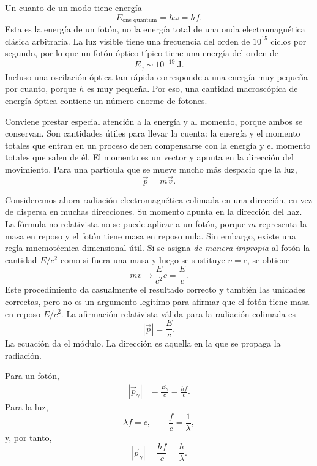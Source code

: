 Un cuanto de un modo tiene energía
\begin{equation}
E_{\text{one quantum}}=\hbar\omega=hf.
\end{equation}
Esta es la energía de un fotón, no la energía total de una onda electromagnética clásica arbitraria. La luz visible tiene una frecuencia del orden de \(10^{15}\) ciclos por segundo, por lo que un fotón óptico típico tiene una energía del orden de
\begin{equation}
E_\gamma\sim 10^{-19}\ \mathrm{J}.
\end{equation}
Incluso una oscilación óptica tan rápida corresponde a una energía muy pequeña por cuanto, porque \(h\) es muy pequeña. Por eso, una cantidad macroscópica de energía óptica contiene un número enorme de fotones.

Conviene prestar especial atención a la energía y al momento, porque ambos se conservan. Son cantidades útiles para llevar la cuenta: la energía y el momento totales que entran en un proceso deben compensarse con la energía y el momento totales que salen de él. El momento es un vector y apunta en la dirección del movimiento. Para una partícula que se mueve mucho más despacio que la luz,
\begin{equation}
\vec p=m\vec v.
\end{equation}

Consideremos ahora radiación electromagnética colimada en una dirección, en vez de dispersa en muchas direcciones. Su momento apunta en la dirección del haz. La fórmula no relativista no se puede aplicar a un fotón, porque \(m\) representa la masa en reposo y el fotón tiene masa en reposo nula. Sin embargo, existe una regla mnemotécnica dimensional útil. Si se asigna \emph{de manera impropia} al fotón la cantidad \(E/c^2\) como si fuera una masa y luego se sustituye \(v=c\), se obtiene
\begin{equation}
mv\longrightarrow \frac{E}{c^2}c=\frac{E}{c}.
\end{equation}
Este procedimiento da casualmente el resultado correcto y también las unidades correctas, pero no es un argumento legítimo para afirmar que el fotón tiene masa en reposo \(E/c^2\). La afirmación relativista válida para la radiación colimada es
\begin{equation}
|\vec p|=\frac{E}{c}.
\end{equation}
La ecuación da el módulo. La dirección es aquella en la que se propaga la radiación.

Para un fotón,
\begin{align}
|\vec p_\gamma|
&=\frac{E_\gamma}{c}
=\frac{hf}{c}.
\end{align}
Para la luz,
\begin{equation}
\lambda f=c,
\qquad
\frac{f}{c}=\frac{1}{\lambda},
\end{equation}
y, por tanto,
\begin{equation}
|\vec p_\gamma|=\frac{hf}{c}=\frac{h}{\lambda}.
\end{equation}

